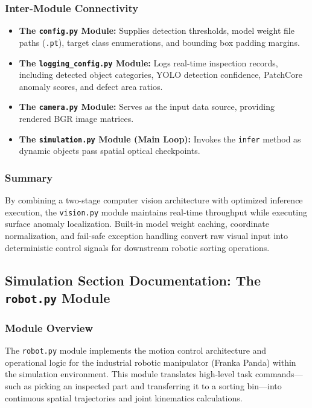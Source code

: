 \documentclass{article}
\begin{document}
\subsubsection{Inter-Module Connectivity}
\begin{itemize}
	\item \textbf{The \texttt{config.py} Module:} Supplies detection thresholds, model weight file paths (\texttt{.pt}), target class enumerations, and bounding box padding margins.
	\item \textbf{The \texttt{logging\_config.py} Module:} Logs real-time inspection records, including detected object categories, YOLO detection confidence, PatchCore anomaly scores, and defect area ratios.
	\item \textbf{The \texttt{camera.py} Module:} Serves as the input data source, providing rendered BGR image matrices.
	\item \textbf{The \texttt{simulation.py} Module (Main Loop):} Invokes the \texttt{infer} method as dynamic objects pass spatial optical checkpoints.
\end{itemize}

\subsubsection{Summary}
By combining a two-stage computer vision architecture with optimized inference execution, the \texttt{vision.py} module maintains real-time throughput while executing surface anomaly localization. Built-in model weight caching, coordinate normalization, and fail-safe exception handling convert raw visual input into deterministic control signals for downstream robotic sorting operations.


\subsection{Simulation Section Documentation: The \texttt{robot.py} Module}

\subsubsection{Module Overview}
The \texttt{robot.py} module implements the motion control architecture and operational logic for the industrial robotic manipulator (Franka Panda) within the simulation environment. This module translates high-level task commands—such as picking an inspected part and transferring it to a sorting bin—into continuous spatial trajectories and joint kinematics calculations.
\end{document}

